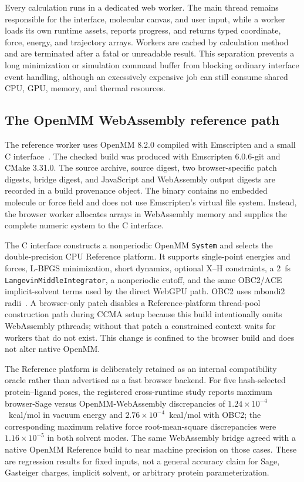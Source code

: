 Every calculation runs in a dedicated web worker.
The main thread remains responsible for the interface, molecular canvas, and
user input, while a worker loads its own runtime assets, reports progress, and
returns typed coordinate, force, energy, and trajectory arrays.
Workers are cached by calculation method and are terminated after a fatal or
unreadable result.
This separation prevents a long minimization or simulation command buffer from
blocking ordinary interface event handling, although an excessively expensive
job can still consume shared CPU, GPU, memory, and thermal resources.

\subsection{The OpenMM WebAssembly reference path}
\label{app:openmm-wasm}

The reference worker uses OpenMM 8.2.0 compiled with Emscripten and a small C
interface~\cite{eastman2017openmm,eastman2024openmm8}.
The checked build was produced with Emscripten 6.0.6-git and CMake 3.31.0.
The source archive, source digest, two browser-specific patch digests, bridge
digest, and JavaScript and WebAssembly output digests are recorded in a build
provenance object.
The binary contains no embedded molecule or force field and does not use
Emscripten's virtual file system.
Instead, the browser worker allocates arrays in WebAssembly memory and supplies
the complete numeric system to the C interface.

The C interface constructs a nonperiodic OpenMM \texttt{System} and selects the
double-precision CPU Reference platform.
It supports single-point energies and forces, L-BFGS minimization, short
dynamics, optional X--H constraints, a 2~fs
\texttt{LangevinMiddleIntegrator}, a nonperiodic cutoff, and the same
OBC2/ACE implicit-solvent terms used by the direct WebGPU path.
OBC2 uses mbondi2 radii~\cite{onufriev2004obc2}.
A browser-only patch disables a Reference-platform thread-pool construction
path during CCMA setup because this build intentionally omits WebAssembly
pthreads; without that patch a constrained context waits for workers that do
not exist.
This change is confined to the browser build and does not alter native OpenMM.

The Reference platform is deliberately retained as an internal compatibility
oracle rather than advertised as a fast browser backend.
For five hash-selected protein--ligand poses, the registered cross-runtime
study reports maximum browser-Sage versus OpenMM-WebAssembly discrepancies of
$1.24\times10^{-4}$~kcal/mol in vacuum energy and
$2.76\times10^{-4}$~kcal/mol with OBC2; the corresponding maximum relative
force root-mean-square discrepancies were $1.16\times10^{-5}$ in both solvent
modes.
The same WebAssembly bridge agreed with a native OpenMM Reference build to
near machine precision on those cases.
These are regression results for fixed inputs, not a general accuracy claim
for Sage, Gasteiger charges, implicit solvent, or arbitrary protein
parameterization.

